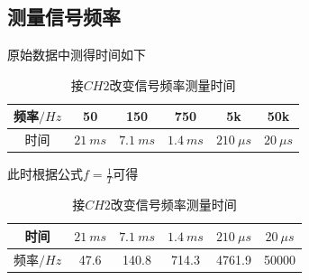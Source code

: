 \documentclass[UTF8]{ctexart}
\begin{document}
\subsection{测量信号频率}
原始数据中测得时间如下
\begin{table}[H]
    \centering
    \caption*{接$CH2$改变信号频率测量时间}
    \begin{tabular}{|c|c|c|c|c|c|}
    \hline
         频率$/Hz$ & 50 & 150 & 750 & 5k & 50k \\
    \hline
         时间 & $21 \ ms$  & $7.1 \ ms$ & $ 1.4 \ ms$ & $210 \ \mu s$ & $20 \ \mu s$ \\
    \hline
    \end{tabular}
\end{table}
此时根据公式$f = \frac{1}{T} $可得
\begin{table}[H]
    \centering
    \caption*{接$CH2$改变信号频率测量时间}
    \begin{tabular}{|c|c|c|c|c|c|}
    \hline
         时间 & $21 \ ms$  & $7.1 \ ms$ & $ 1.4 \ ms$ & $210 \ \mu s$ & $20 \ \mu s$ \\
    \hline
        频率$/Hz$ & 47.6  & 140.8 &  714.3 & 4761.9 & 50000 \\
    \hline
    \end{tabular}
\end{table}
\end{document}
